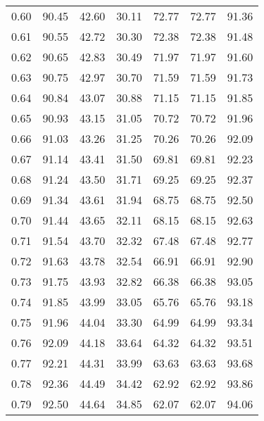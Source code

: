 \begin{tabular}{|c|c|c|c|c|c|c|}
      0.60 &     90.45 &     42.60 &      30.11 &   72.77 &      72.77 &         91.36 \\
      0.61 &     90.55 &     42.72 &      30.30 &   72.38 &      72.38 &         91.48 \\
      0.62 &     90.65 &     42.83 &      30.49 &   71.97 &      71.97 &         91.60 \\
      0.63 &     90.75 &     42.97 &      30.70 &   71.59 &      71.59 &         91.73 \\
      0.64 &     90.84 &     43.07 &      30.88 &   71.15 &      71.15 &         91.85 \\
      0.65 &     90.93 &     43.15 &      31.05 &   70.72 &      70.72 &         91.96 \\
      0.66 &     91.03 &     43.26 &      31.25 &   70.26 &      70.26 &         92.09 \\
      0.67 &     91.14 &     43.41 &      31.50 &   69.81 &      69.81 &         92.23 \\
      0.68 &     91.24 &     43.50 &      31.71 &   69.25 &      69.25 &         92.37 \\
      0.69 &     91.34 &     43.61 &      31.94 &   68.75 &      68.75 &         92.50 \\
      0.70 &     91.44 &     43.65 &      32.11 &   68.15 &      68.15 &         92.63 \\
      0.71 &     91.54 &     43.70 &      32.32 &   67.48 &      67.48 &         92.77 \\
      0.72 &     91.63 &     43.78 &      32.54 &   66.91 &      66.91 &         92.90 \\
      0.73 &     91.75 &     43.93 &      32.82 &   66.38 &      66.38 &         93.05 \\
      0.74 &     91.85 &     43.99 &      33.05 &   65.76 &      65.76 &         93.18 \\
      0.75 &     91.96 &     44.04 &      33.30 &   64.99 &      64.99 &         93.34 \\
      0.76 &     92.09 &     44.18 &      33.64 &   64.32 &      64.32 &         93.51 \\
      0.77 &     92.21 &     44.31 &      33.99 &   63.63 &      63.63 &         93.68 \\
      0.78 &     92.36 &     44.49 &      34.42 &   62.92 &      62.92 &         93.86 \\
      0.79 &     92.50 &     44.64 &      34.85 &   62.07 &      62.07 &         94.06 \\

\end{tabular}
